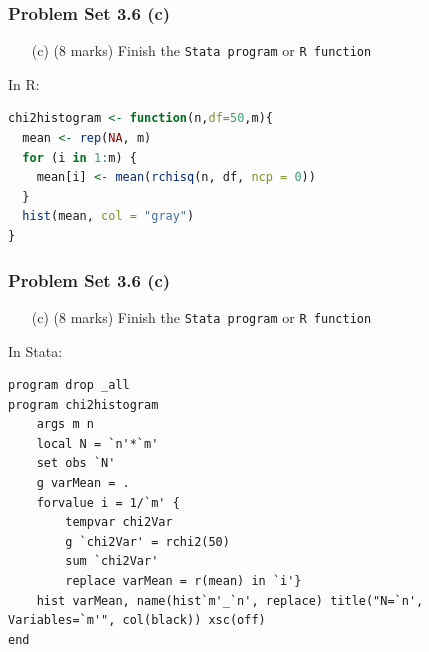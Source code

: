 \documentclass[xcolor=table]{beamer}
\begin{document}
\begin{frame}[fragile]
\frametitle{Problem Set 3.6 (c)}
\begin{itemize}
\item[(c)] (8 marks) Finish the \texttt{Stata program} or \texttt{R function}
\end{itemize} \pause
In R:
\begin{lstlisting}[language = R]
chi2histogram <- function(n,df=50,m){
  mean <- rep(NA, m)
  for (i in 1:m) {
    mean[i] <- mean(rchisq(n, df, ncp = 0))
  }
  hist(mean, col = "gray")
}
\end{lstlisting}
\end{frame}

\begin{frame}[fragile]
\frametitle{Problem Set 3.6 (c)}
\begin{itemize}
\item[(c)] (8 marks) Finish the \texttt{Stata program} or \texttt{R function}
\end{itemize} \pause
In Stata:
\begin{lstlisting}
program drop _all
program chi2histogram
	args m n
    local N = `n'*`m'
    set obs `N'
    g varMean = .
    forvalue i = 1/`m' {
    	tempvar chi2Var
       	g `chi2Var' = rchi2(50)
       	sum `chi2Var'
       	replace varMean = r(mean) in `i'}
	hist varMean, name(hist`m'_`n', replace) title("N=`n', Variables=`m'", col(black)) xsc(off)
end
\end{lstlisting}
\end{frame}

\end{document}
